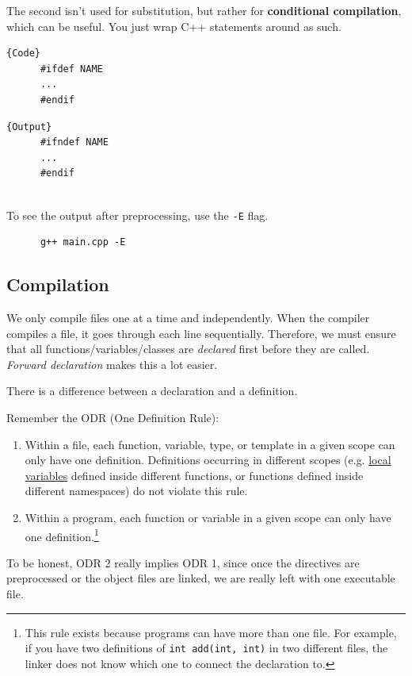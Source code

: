 \documentclass{article}
\newcounter{definition}[section]
\newcounter{example}[section]
\begin{document}
    The second isn't used for substitution, but rather for \textbf{conditional compilation}, which can be useful. You just wrap C++ statements around as such.

    \noindent\begin{minipage}{.5\textwidth}
    \begin{lstlisting}[]{Code}
      #ifdef NAME 
      ... 
      #endif
    \end{lstlisting}
    \end{minipage}
    \hfill
    \begin{minipage}{.49\textwidth}
    \begin{lstlisting}[]{Output}
      #ifndef NAME 
      ... 
      #endif
      
    \end{lstlisting}
    \end{minipage} 

    To see the output after preprocessing, use the \texttt{-E} flag. 
    \begin{lstlisting}
      g++ main.cpp -E
    \end{lstlisting}

  \subsection{Compilation} 

    We only compile files one at a time and independently. When the compiler compiles a file, it goes through each line sequentially. Therefore, we must ensure that all functions/variables/classes are \textit{declared} first before they are called. \textit{Forward declaration} makes this a lot easier. 

    There is a difference between a declaration and a definition. 

    \begin{definition}[ODR]
      \label{def:odr}
      Remember the ODR (One Definition Rule): 
      \begin{enumerate}
        \item Within a file, each function, variable, type, or template in a given scope can only have one definition. Definitions occurring in different scopes (e.g. \hyperref[def:local-variables]{local variables} defined inside different functions, or functions defined inside different namespaces) do not violate this rule. 

        \item Within a program, each function or variable in a given scope can only have one definition.\footnote{This rule exists because programs can have more than one file. For example, if you have two definitions of \texttt{int add(int, int)} in two different files, the linker does not know which one to connect the declaration to.}
      \end{enumerate}
      To be honest, ODR 2 really implies ODR 1, since once the directives are preprocessed or the object files are linked, we are really left with one executable file. 
    \end{definition} 
\end{document}
